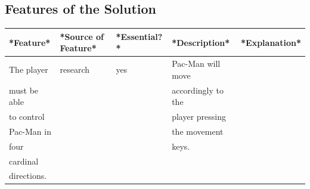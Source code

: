 \documentclass[letterpaper, 11pt]{article}
\begin{document}
\subsection{Features of the Solution}
\label{sec:org3a9bac2}
\begin{center}
\begin{tabular}{|l|l|l|l|l|}
\hline
*Feature* & *Source of Feature* & *Essential?* & *Description* & *Explanation* \\
\hline
The player & research & yes & Pac-Man will move & \\
must be able & & & accordingly to the & \\
to control & & & player pressing & \\
Pac-Man in & & & the movement & \\
four & & & keys. & \\
cardinal & & & & \\
directions. & & & & \\
\hline
\end{tabular}
\end{center}

\printbibliography
\end{document}

